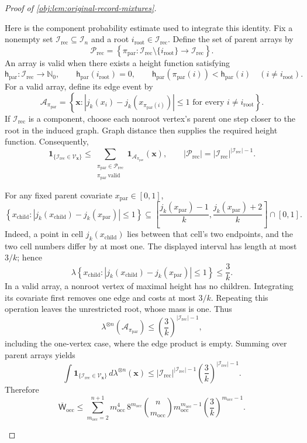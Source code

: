 \begin{proof}[Proof of \cref{obj:lem:original-record-mixtures}]
\begin{enumerate}
Here is the component probability estimate used to integrate this
identity. Fix a nonempty set \(\mathcal I_{\mathrm{rec}}\subseteq\mathcal I_n\)
and a root \(i_{\mathrm{root}}\in\mathcal I_{\mathrm{rec}}\). Define the set
of parent arrays by
\[
\mathscr P_{\mathrm{rec}}
=\left\{
\pi_{\mathrm{par}}:
\mathcal I_{\mathrm{rec}}\setminus\{i_{\mathrm{root}}\}
\longrightarrow\mathcal I_{\mathrm{rec}}
\right\}.
\]
An array is valid when there exists a height function satisfying
\[
\mathsf h_{\mathrm{par}}:\mathcal I_{\mathrm{rec}}\to\mathbb N_0,
\qquad
\mathsf h_{\mathrm{par}}(i_{\mathrm{root}})=0,
\qquad
\mathsf h_{\mathrm{par}}(\pi_{\mathrm{par}}(i))
<\mathsf h_{\mathrm{par}}(i)
\quad(i\ne i_{\mathrm{root}}).
\]
For a valid array, define its edge event by
\[
\mathscr A_{\pi_{\mathrm{par}}}
=
\left\{\mathbf x:
|j_k(x_i)-j_k(x_{\pi_{\mathrm{par}}(i)})|\le1
\text{ for every }i\ne i_{\mathrm{root}}\right\}.
\]
If \(\mathcal I_{\mathrm{rec}}\) is a component, choose each nonroot
vertex's parent one step closer to the root in the induced graph.
Graph distance then supplies the required height function. Consequently,
\[
\mathbf1_{\{\mathcal I_{\mathrm{rec}}\in\mathscr V_{\mathbf x}\}}
\le
\sum_{\substack{\pi_{\mathrm{par}}\in\mathscr P_{\mathrm{rec}}\\
\pi_{\mathrm{par}}\ \mathrm{valid}}}
\mathbf1_{\mathscr A_{\pi_{\mathrm{par}}}}(\mathbf x),
\qquad
|\mathscr P_{\mathrm{rec}}|
=|\mathcal I_{\mathrm{rec}}|^{|\mathcal I_{\mathrm{rec}}|-1}.
\]

For any fixed parent covariate \(x_{\mathrm{par}}\in[0,1]\),
\[
\left\{x_{\mathrm{child}}:
|j_k(x_{\mathrm{child}})-j_k(x_{\mathrm{par}})|\le1\right\}
\subseteq
\left[
\frac{j_k(x_{\mathrm{par}})-1}{k},
\frac{j_k(x_{\mathrm{par}})+2}{k}
\right]\cap[0,1].
\]
Indeed, a point in cell \(j_k(x_{\mathrm{child}})\) lies between that
cell's two endpoints, and the two cell numbers differ by at most one.
The displayed interval has length at most \(3/k\); hence
\[
\lambda\left\{x_{\mathrm{child}}:
|j_k(x_{\mathrm{child}})-j_k(x_{\mathrm{par}})|\le1\right\}
\le\frac3k.
\]
In a valid array, a nonroot vertex of maximal height has no children.
Integrating its covariate first removes one edge and costs at most
\(3/k\). Repeating this operation leaves the unrestricted root, whose
mass is one. Thus
\[
\lambda^{\otimes n}(\mathscr A_{\pi_{\mathrm{par}}})
\le
\left(\frac3k\right)^{|\mathcal I_{\mathrm{rec}}|-1},
\]
including the one-vertex case, where the edge product is empty. Summing
over parent arrays yields
\[
\int
\mathbf1_{\{\mathcal I_{\mathrm{rec}}\in\mathscr V_{\mathbf x}\}}\,
d\lambda^{\otimes n}(\mathbf x)
\le
|\mathcal I_{\mathrm{rec}}|^{|\mathcal I_{\mathrm{rec}}|-1}
\left(\frac3k\right)^{|\mathcal I_{\mathrm{rec}}|-1}.
\]
Therefore
\[
\overline{\mathsf W}_{\mathrm{occ}}
\le
\sum_{m_{\mathrm{occ}}=2}^{n+1}
m_{\mathrm{occ}}^4\,8^{m_{\mathrm{occ}}}
\binom n{m_{\mathrm{occ}}}
m_{\mathrm{occ}}^{m_{\mathrm{occ}}-1}
\left(\frac3k\right)^{m_{\mathrm{occ}}-1}.
\]


\end{enumerate}
\end{proof}
